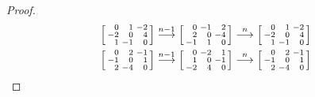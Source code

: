 \documentclass{amsart}
\theoremstyle{definition}
\theoremstyle{remark}
\numberwithin{equation}{section}
\newcommand{\0}{{\mathbf{0}}}
\begin{document}
\begin{proof}
\begin{align*}
&\begin{bsmallmatrix*}[r]
	0 & 1 & -2 \\
	-2 & 0 & 4 \\
	1 & -1 & 0
\end{bsmallmatrix*}\overset{n-1}{\longrightarrow}
\begin{bsmallmatrix*}[r]
	0 & -1 & 2 \\
	2 & 0 & -4 \\
	-1 & 1 & 0
\end{bsmallmatrix*}\overset{n}{\longrightarrow}
\begin{bsmallmatrix*}[r]
	0 & 1 & -2 \\
	-2 & 0 & 4 \\
	1 & -1 & 0
\end{bsmallmatrix*}\\ 
&\begin{bsmallmatrix*}[r]
	0 & 2 & -1 \\
	-1 & 0 & 1 \\
	2 & -4 & 0
\end{bsmallmatrix*}\overset{n-1}{\longrightarrow} 
\begin{bsmallmatrix*}[r]
	0 & -2 & 1 \\
	1 & 0 & -1 \\
	-2 & 4 & 0
\end{bsmallmatrix*}\overset{n}{\longrightarrow} 
\begin{bsmallmatrix*}[r]
	0 & 2 & -1 \\
	-1 & 0 & 1 \\
	2 & -4 & 0
\end{bsmallmatrix*} \qedhere
\end{align*}
\end{proof}
\end{document}
